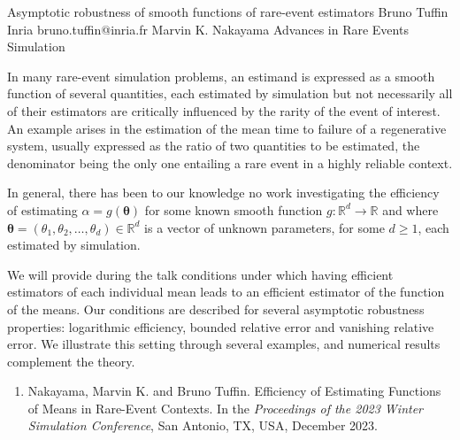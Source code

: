 \begin{talk}
\begin{enumerate}
\end{enumerate}

\end{talk}

\begin{talk}
  {Asymptotic robustness of  smooth functions of  rare-event estimators}%
  {Bruno Tuffin}%
  {Inria}%
  {bruno.tuffin@inria.fr}%
  {Marvin K. Nakayama}%
  {Advances in Rare Events Simulation}%
    
   
In many rare-event simulation problems, an estimand is expressed  as a smooth function of several quantities,  each
estimated by simulation  but not necessarily all of their estimators are critically influenced by
the rarity of the event of interest.  
An example arises in the estimation of the mean time to failure of a regenerative system, usually expressed as the ratio of two quantities to be estimated, the denominator being the only one  entailing a rare event in a highly reliable context.

In general, there has been to our knowledge no work investigating  the efficiency  of estimating $\alpha = g({\boldsymbol{\theta}})$
for some known  smooth function $g : \mathbb{R}^d \to \mathbb{R}$ and where ${\boldsymbol{\theta}} = (\theta_1, \theta_2, \ldots, \theta_d) \in \mathbb{R}^d$ is a vector of unknown parameters, for some $d \geq 1$, each  estimated by simulation.

We will provide during the talk conditions under which having efficient estimators of each individual mean leads to an efficient estimator of the function of the means. Our conditions are described for several asymptotic robustness properties: logarithmic efficiency, bounded relative error and vanishing relative error.
We illustrate this setting through several examples, and numerical results complement the theory.


   

\medskip


\begin{enumerate}
 \item[{[1]}]  Nakayama, Marvin K. and Bruno Tuffin.  Efficiency of Estimating Functions of Means in Rare-Event Contexts. In the {\it Proceedings of the 2023 Winter Simulation Conference}, San Antonio, TX, USA, December 2023.
\end{enumerate}

\end{talk}

